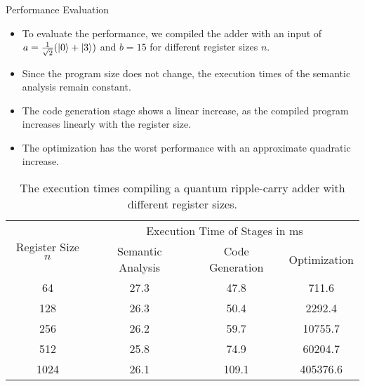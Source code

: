 \begin{frame}{Performance Evaluation}
    \begin{itemize}
        \item To evaluate the performance, we compiled the adder with an input of $a = \frac{1}{\sqrt{2}} (\ket{0} + \ket{3})$ and $b = 15$ for different register sizes $n$.
        \item Since the program size does not change, the execution times of the semantic analysis remain constant.
        \item The code generation stage shows a linear increase, as the compiled program increases linearly with the register size.
        \item The optimization has the worst performance with an approximate quadratic increase.
    \end{itemize}
    \begin{table}[htp]
        \centering     
        \begin{tabular}{c|ccc}
        \multirow{2}{*}{Register Size $n$} & \multicolumn{3}{c}{Execution Time of Stages in ms}                                                  \\ \cline{2-4} 
                                           & \multicolumn{1}{c|}{Semantic Analysis} & \multicolumn{1}{c|}{Code Generation} & Optimization \\ \hline
        64                                 & \multicolumn{1}{c|}{27.3}                & \multicolumn{1}{c|}{47.8}              & 711.6          \\
        128                                & \multicolumn{1}{c|}{26.3}                & \multicolumn{1}{c|}{50.4}              & 2292.4         \\
        256                                & \multicolumn{1}{c|}{26.2}                & \multicolumn{1}{c|}{59.7}              & 10755.7        \\
        512                                & \multicolumn{1}{c|}{25.8}                & \multicolumn{1}{c|}{74.9}              & 60204.7        \\
        1024                               & \multicolumn{1}{c|}{26.1}                & \multicolumn{1}{c|}{109.1}             & 405376.6      
    \end{tabular}
    \caption{The execution times compiling a quantum ripple-carry adder with different register sizes.}
    \end{table}
    
\end{frame}
